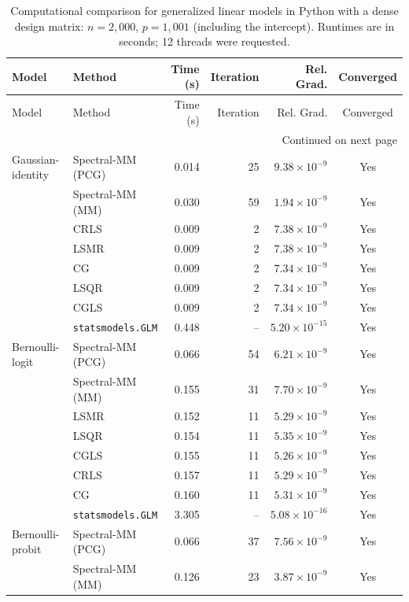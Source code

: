 \begingroup
\small
\setlength{\tabcolsep}{5pt}
\begin{longtable}{llrrrc}
\caption{Computational comparison for generalized linear models in Python with a dense design matrix: $n=2{,}000$, $p=1{,}001$ (including the intercept). Runtimes are in seconds; 12 threads were requested.}
\label{tab:python-dense-glm-strict}\\
\toprule
Model & Method & Time (s) & Iteration & Rel. Grad. & Converged \\
\midrule
\endfirsthead
\toprule
Model & Method & Time (s) & Iteration & Rel. Grad. & Converged \\
\midrule
\endhead
\midrule
\multicolumn{6}{r}{Continued on next page}\\
\endfoot
\bottomrule
\endlastfoot
Gaussian-identity & Spectral-MM (PCG) & 0.014 & 25 & $9.38\times10^{-9}$ & Yes \\
 & Spectral-MM (MM) & 0.030 & 59 & $1.94\times10^{-9}$ & Yes \\
 & CRLS & 0.009 & 2 & $7.38\times10^{-9}$ & Yes \\
 & LSMR & 0.009 & 2 & $7.38\times10^{-9}$ & Yes \\
 & CG & 0.009 & 2 & $7.34\times10^{-9}$ & Yes \\
 & LSQR & 0.009 & 2 & $7.34\times10^{-9}$ & Yes \\
 & CGLS & 0.009 & 2 & $7.34\times10^{-9}$ & Yes \\
 & \texttt{statsmodels.GLM} & 0.448 & -- & $5.20\times10^{-15}$ & Yes \\
\midrule
Bernoulli-logit & Spectral-MM (PCG) & 0.066 & 54 & $6.21\times10^{-9}$ & Yes \\
 & Spectral-MM (MM) & 0.155 & 31 & $7.70\times10^{-9}$ & Yes \\
 & LSMR & 0.152 & 11 & $5.29\times10^{-9}$ & Yes \\
 & LSQR & 0.154 & 11 & $5.35\times10^{-9}$ & Yes \\
 & CGLS & 0.155 & 11 & $5.26\times10^{-9}$ & Yes \\
 & CRLS & 0.157 & 11 & $5.29\times10^{-9}$ & Yes \\
 & CG & 0.160 & 11 & $5.31\times10^{-9}$ & Yes \\
 & \texttt{statsmodels.GLM} & 3.305 & -- & $5.08\times10^{-16}$ & Yes \\
\midrule
Bernoulli-probit & Spectral-MM (PCG) & 0.066 & 37 & $7.56\times10^{-9}$ & Yes \\
 & Spectral-MM (MM) & 0.126 & 23 & $3.87\times10^{-9}$ & Yes \\

\end{longtable}
